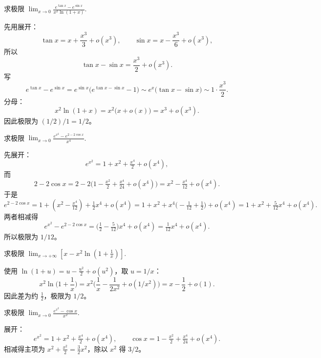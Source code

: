 \begin{question}{}{}

    求极限 $\lim_{x \to 0} \frac{e^{\tan x}-e^{\sin x}}{x^2 \ln(1+x)}$.
\end{question}
\begin{solution}
    先用展开：
    \[
        \tan x = x+\frac{x^3}{3}+o(x^3),\qquad \sin x = x-\frac{x^3}{6}+o(x^3),
    \]
    所以
    \[
        \tan x-\sin x=\frac{x^3}{2}+o(x^3).
    \]
    写
    \[
        e^{\tan x}-e^{\sin x}=e^{\sin x}\big(e^{\tan x-\sin x}-1\big)
        \sim e^{x}\big(\tan x-\sin x\big)\sim 1\cdot\frac{x^3}{2}.
    \]
    分母：
    \[
        x^2\ln(1+x)=x^2\big(x+o(x)\big)=x^3+o(x^3).
    \]
    因此极限为 $(1/2)/1=1/2$。
\end{solution}

\begin{question}{}{}

    求极限 $\lim_{x \to 0} \frac{e^{x^2}-e^{2-2\cos x}}{x^4}$.
\end{question}
\begin{solution}
    先展开：
    \[
        e^{x^2}=1+x^2+\tfrac{x^4}{2}+o(x^4),
    \]
    而
    \[
        2-2\cos x=2-2\big(1-\tfrac{x^2}{2}+\tfrac{x^4}{24}+o(x^4)\big)=x^2-\tfrac{x^4}{12}+o(x^4).
    \]
    于是
    \[
        e^{2-2\cos x}=1+(x^2-\tfrac{x^4}{12})+\tfrac{1}{2}x^4+o(x^4)
        =1+x^2+x^4\Big(-\tfrac{1}{12}+\tfrac{1}{2}\Big)+o(x^4)
        =1+x^2+\tfrac{5}{12}x^4+o(x^4).
    \]
    两者相减得
    \[
        e^{x^2}-e^{2-2\cos x}=\Big(\tfrac{1}{2}-\tfrac{5}{12}\Big)x^4+o(x^4)=\tfrac{1}{12}x^4+o(x^4).
    \]
    所以极限为 $1/12$。
\end{solution}

\begin{question}{}{}

    求极限 $\lim_{x \to +\infty} \left[x - x^2 \ln \left(1 + \frac{1}{x}\right)\right]$.
\end{question}
\begin{solution}
    使用 $\ln(1+u)=u-\tfrac{u^2}{2}+o(u^2)$，取 $u=1/x$：
    \[
        x^2\ln\Big(1+\frac{1}{x}\Big)=x^2\Big(\frac{1}{x}-\frac{1}{2x^2}+o(1/x^2)\Big)=x-\frac{1}{2}+o(1).
    \]
    因此差为约 $\tfrac12$，极限为 $1/2$。
\end{solution}

\begin{question}{}{}

    求极限 $\lim_{x \to 0} \frac{e^{x^2} - \cos x}{x^2}$.
\end{question}
\begin{solution}
    展开：
    \[
        e^{x^2}=1+x^2+\tfrac{x^4}{2}+o(x^4),\qquad \cos x=1-\tfrac{x^2}{2}+\tfrac{x^4}{24}+o(x^4).
    \]
    相减得主项为 $x^2+\tfrac{x^2}{2}=\tfrac{3}{2}x^2$，除以 $x^2$ 得 $3/2$。
\end{solution}

